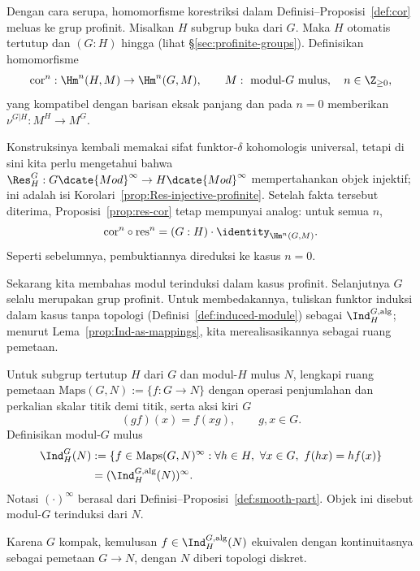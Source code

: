 Dengan cara serupa, homomorfisme korestriksi dalam
Definisi--Proposisi~\ref{def:cor} meluas ke grup profinit. Misalkan $H$
subgrup buka dari $G$. Maka $H$ otomatis tertutup dan $(G:H)$ hingga
(lihat \S\ref{sec:profinite-groups}). Definisikan homomorfisme
\[ \mathrm{cor}^n:\Hm^n(H,M)\to\Hm^n(G,M),\qquad
	M:\text{ modul-$G$ mulus},\quad n\in\Z_{\geq0}, \]
yang kompatibel dengan barisan eksak panjang dan pada $n=0$ memberikan
$\nu^{G|H}:M^H\to M^G$.

Konstruksinya kembali memakai sifat funktor-$\delta$ kohomologis universal,
tetapi di sini kita perlu mengetahui bahwa
$\Res^G_H:G\dcate{Mod}^\infty\to H\dcate{Mod}^\infty$ mempertahankan objek
injektif; ini adalah isi Korolari~\ref{prop:Res-injective-profinite}. Setelah
fakta tersebut diterima, Proposisi~\ref{prop:res-cor} tetap mempunyai analog:
untuk semua $n$,
\[ \mathrm{cor}^n\circ\mathrm{res}^n
	=(G:H)\cdot\identity_{\Hm^n(G,M)}. \]
Seperti sebelumnya, pembuktiannya direduksi ke kasus $n=0$.

Sekarang kita membahas modul terinduksi dalam kasus profinit. Selanjutnya $G$
selalu merupakan grup profinit. Untuk membedakannya, tuliskan funktor induksi
dalam kasus tanpa topologi (Definisi~\ref{def:induced-module}) sebagai
$\Ind^{G,\mathrm{alg}}_H$; menurut Lema~\ref{prop:Ind-as-mappings}, kita
merealisasikannya sebagai ruang pemetaan.

\begin{definition}
	Untuk subgrup tertutup $H$ dari $G$ dan modul-$H$ mulus $N$, lengkapi ruang
	pemetaan $\mathrm{Maps}(G,N):=\{f:G\to N\}$ dengan operasi penjumlahan dan
	perkalian skalar titik demi titik, serta aksi kiri $G$
	\[ (gf)(x)=f(xg),\qquad g,x\in G. \]
	Definisikan modul-$G$ mulus
	\begin{align*}
		\Ind^G_H(N)&:=\{f\in\mathrm{Maps}(G,N)^\infty:
		\forall h\in H,\ \forall x\in G,\ f(hx)=hf(x)\}\\
		&=(\Ind^{G,\mathrm{alg}}_H(N))^\infty.
	\end{align*}
	Notasi $(\cdot)^\infty$ berasal dari
	Definisi--Proposisi~\ref{def:smooth-part}. Objek ini disebut modul-$G$
	terinduksi dari $N$.
\end{definition}

Karena $G$ kompak, kemulusan $f\in\Ind^{G,\mathrm{alg}}_H(N)$ ekuivalen
dengan kontinuitasnya sebagai pemetaan $G\to N$, dengan $N$ diberi topologi
diskret.

